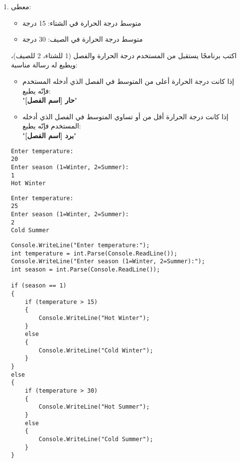 ﻿\documentclass[12pt]{article}
\begin{document}
\begin{enumerate}[itemsep=3em]
\begin{enumerate}
\item
معطى:
\begin{itemize}
\item متوسط درجة الحرارة في الشتاء: 15 درجة
\item متوسط درجة الحرارة في الصيف: 30 درجة
\end{itemize}%
اكتب برنامجًا يستقبل من المستخدم درجة الحرارة والفصل (1 للشتاء، 2 للصيف)، ويطبع له رسالة مناسبة:
\begin{itemize}
\item إذا كانت درجة الحرارة أعلى من المتوسط في الفصل الذي أدخله المستخدم فإنّه يطبع: \\ "\textbf{حار [اسم الفصل]}"
\item إذا كانت درجة الحرارة أقل من أو تساوي المتوسط في الفصل الذي أدخله المستخدم فإنّه يطبع: \\ "\textbf{برد [اسم الفصل]}"
\end{itemize}%
\ifdetailed
\begin{boxExample}[1]
\begin{english}
\begin{verbatim}
Enter temperature:
20
Enter season (1=Winter, 2=Summer):
1
Hot Winter
\end{verbatim}
\end{english}
\end{boxExample}
\begin{boxExample}[2]
\begin{english}
\begin{verbatim}
Enter temperature:
25
Enter season (1=Winter, 2=Summer):
2
Cold Summer
\end{verbatim}
\end{english}
\end{boxExample}

\ifwithsols
\begin{boxSolution}
\begin{english}
\begin{verbatim}
Console.WriteLine("Enter temperature:");
int temperature = int.Parse(Console.ReadLine());
Console.WriteLine("Enter season (1=Winter, 2=Summer):");
int season = int.Parse(Console.ReadLine());

if (season == 1)
{
    if (temperature > 15)
    {
        Console.WriteLine("Hot Winter");
    }
    else
    {
        Console.WriteLine("Cold Winter");
    }
}
else
{
    if (temperature > 30)
    {
        Console.WriteLine("Hot Summer");
    }
    else
    {
        Console.WriteLine("Cold Summer");
    }
}
\end{verbatim}
\end{english}
\end{boxSolution}
\fi
\clearpage
\fi


\end{enumerate}
\end{enumerate}
\end{document}
